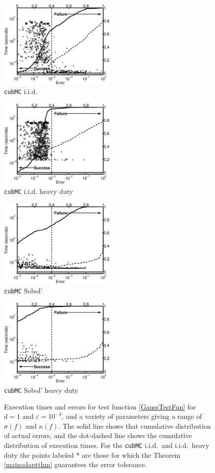 \documentclass[graybox]{svmult}
\begin{document}
\begin{figure}
\begin{minipage}{5.7cm} \centering \includegraphics[width=5.7cm]{iid.eps} \\ {\tt cubMC} i.i.d. \end{minipage}
\begin{minipage}{5.7cm} \centering \includegraphics[width=5.7cm]{iidheavy.eps} \\ {\tt cubMC} i.i.d. heavy duty\end{minipage}
\begin{minipage}{5.7cm} \centering \includegraphics[width=5.7cm]{sobol.eps} \\ {\tt cubMC} Sobol' \end{minipage}
\begin{minipage}{5.7cm} \centering \includegraphics[width=5.7cm]{sobolheavy.eps} \\ {\tt cubMC} Sobol' heavy duty \end{minipage}
\caption{Execution times and errors for test function \eqref{GaussTestFun} for $d=1$ and $\varepsilon=10^{-3}$, and a variety of parameters giving a range of $\sigma(f)$ and $\kappa(f)$. The solid line shows that cumulative distribution of actual errors, and the dot-dashed line shows the cumulative distribution of execution times.  For the {\tt cubMC} i.i.d.\ and i.i.d.\ heavy duty the points labeled * are those for which the Theorem \ref{mainadaptthm} guarantees the error tolerance. \label{GaussTestFunFig}}
\end{figure}
\end{document}

